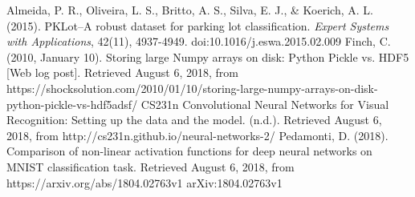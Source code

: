 \documentclass[a4paper, 11pt]{article} %
\begin{document}
\newpage
\begin{thebibliography}{unsrt}
		Almeida, P. R., Oliveira, L. S., Britto, A. S., Silva, E. J., \& Koerich, A. L. (2015). PKLot--A robust 
		dataset for parking lot classification. \textit{Expert Systems with Applications}, 42(11), 
		4937-4949. doi:10.1016/j.eswa.2015.02.009
		Finch, C. (2010, January 10). Storing large Numpy arrays on disk: 
		Python Pickle vs. HDF5 [Web log post]. Retrieved August 6, 2018, from 
		https://shocksolution.com/2010/01/10/storing-large-numpy-arrays-on-disk-python-pickle-vs-hdf5adsf/
		CS231n Convolutional Neural Networks for Visual Recognition: Setting up 
		the data and the model. (n.d.). Retrieved August 6, 2018, from 
		http://cs231n.github.io/neural-networks-2/
		Pedamonti, D. (2018). Comparison of non-linear activation functions for 
		deep neural networks on MNIST classification task. Retrieved August 6, 
		2018, from https://arxiv.org/abs/1804.02763v1 arXiv:1804.02763v1
\end{thebibliography}
\end{document}
